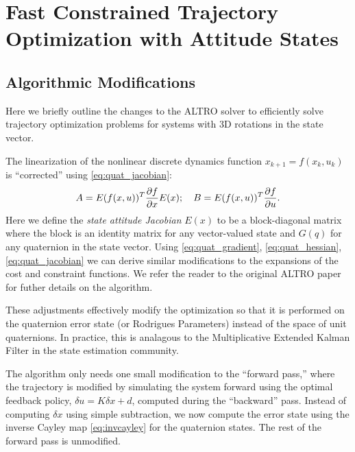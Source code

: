 \documentclass[letterpaper, 10 pt, conference]{ieeeconf}  %
\newcommand{\todo}[1]{\textcolor{red}{TODO: #1}}
\begin{document}
\section{Fast Constrained Trajectory Optimization with Attitude States}
    \subsection{Algorithmic Modifications}
    Here we briefly outline the changes to the ALTRO solver \cite{howell2019altro} to 
    efficiently solve trajectory optimization problems for systems with 3D rotations in the
    state vector. 

    The linearization of the nonlinear discrete dynamics function $x_{k+1} = f(x_k,u_k)$
    is ``corrected'' using \ref{eq:quat_jacobian}: \begin{equation} A = E(f(x,u))^T
    \pdv{f}{x} E(x); \quad B = E(f(x,u))^T \pdv{f}{u}. \end{equation} Here we define the
    \textit{state attitude Jacobian} $E(x)$ to be a block-diagonal matrix where the block
    is an identity matrix for any vector-valued state and $G(q)$ for any quaternion in
    the state vector. Using \eqref{eq:quat_gradient}, \eqref{eq:quat_hessian},
    \eqref{eq:quat_jacobian} we can derive similar modifications to the expansions of the
    cost and constraint functions. We refer the reader to the original ALTRO paper
    \cite{howell2019altro} for futher details on the algorithm.

    These adjustments effectively modify the optimization so that it is performed on the
    quaternion error state (or Rodrigues Parameters) instead of the space of unit
    quaternions. In practice, this is analagous to the Multiplicative Extended Kalman
    Filter \cite{markley2014fundamentals} in the state estimation community.

    The algorithm only needs one small modification to the ``forward pass,'' where the
    trajectory is modified by simulating the system forward using the optimal feedback
    policy, $\delta u = K \delta x + d$, computed during the ``backward'' pass. Instead of 
    computing $\delta x$ using simple subtraction, we now compute the error state using the
    inverse Cayley map \eqref{eq:invcayley} for the quaternion states. The rest of the
    forward pass is unmodified. 
\end{document}

